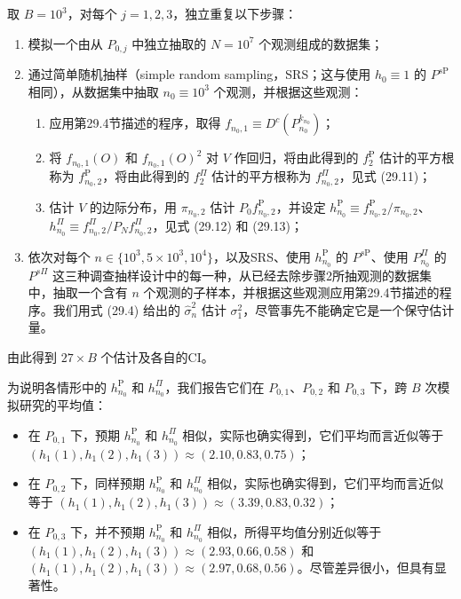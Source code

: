 取 $B=10^3$，对每个 $j=1,2,3$，独立重复以下步骤：
\begin{enumerate}
\item 模拟一个由从 $P_{0,j}$ 中独立抽取的 $N=10^7$ 个观测组成的数据集；
\item 通过简单随机抽样（simple random sampling，SRS；这与使用 $h_0\equiv1$ 的 $P^{s\mathrm P}$ 相同），从数据集中抽取 $n_0\equiv10^3$ 个观测，并根据这些观测：
\begin{enumerate}[label=(\alph*)]
\item 应用第29.4节描述的程序，取得 $f_{n_0,1}\equiv D^c(P_{n_0}^{k_{n_0}})$；
\item 将 $f_{n_0,1}(O)$ 和 $f_{n_0,1}(O)^2$ 对 $V$ 作回归，将由此得到的 $f_2^{\mathrm P}$ 估计的平方根称为 $f_{n_0,2}^{\mathrm P}$，将由此得到的 $f_2^\Pi$ 估计的平方根称为 $f_{n_0,2}^{\Pi}$，见式 (29.11)；
\item 估计 $V$ 的边际分布，用 $\pi_{n_0,2}$ 估计 $P_0f_{n_0,2}^{\mathrm P}$，并设定 $h_{n_0}^{\mathrm P}\equiv f_{n_0,2}^{\mathrm P}/\pi_{n_0,2}$、$h_{n_0}^{\Pi}\equiv f_{n_0,2}^{\Pi}/P_Nf_{n_0,2}^{\Pi}$，见式 (29.12) 和 (29.13)；
\end{enumerate}
\item 依次对每个 $n\in\{10^3,5\times10^3,10^4\}$，以及SRS、使用 $h_{n_0}^{\mathrm P}$ 的 $P^{s\mathrm P}$、使用 $P_{n_0}^{\Pi}$ 的 $P^{s\Pi}$ 这三种调查抽样设计中的每一种，从已经去除步骤2所抽观测的数据集中，抽取一个含有 $n$ 个观测的子样本，并根据这些观测应用第29.4节描述的程序。我们用式 (29.4) 给出的 $\hat\sigma_n^2$ 估计 $\sigma_1^2$，尽管事先不能确定它是一个保守估计量。
\end{enumerate}
由此得到 $27\times B$ 个估计及各自的CI。

为说明各情形中的 $h_{n_0}^{\mathrm P}$ 和 $h_{n_0}^{\Pi}$，我们报告它们在 $P_{0,1}$、$P_{0,2}$ 和 $P_{0,3}$ 下，跨 $B$ 次模拟研究的平均值：
\begin{itemize}[label=--]
\item 在 $P_{0,1}$ 下，预期 $h_{n_0}^{\mathrm P}$ 和 $h_{n_0}^{\Pi}$ 相似，实际也确实得到，它们平均而言近似等于 $(h_1(1),h_1(2),h_1(3))\approx(2.10,0.83,0.75)$；
\item 在 $P_{0,2}$ 下，同样预期 $h_{n_0}^{\mathrm P}$ 和 $h_{n_0}^{\Pi}$ 相似，实际也确实得到，它们平均而言近似等于 $(h_1(1),h_1(2),h_1(3))\approx(3.39,0.83,0.32)$；
\item 在 $P_{0,3}$ 下，并不预期 $h_{n_0}^{\mathrm P}$ 和 $h_{n_0}^{\Pi}$ 相似，所得平均值分别近似等于 $(h_1(1),h_1(2),h_1(3))\approx(2.93,0.66,0.58)$ 和 $(h_1(1),h_1(2),h_1(3))\approx(2.97,0.68,0.56)$。尽管差异很小，但具有显著性。
\end{itemize}

